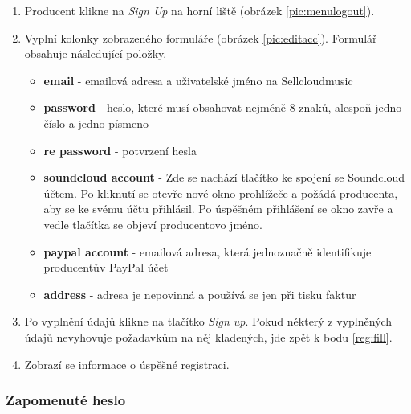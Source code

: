 \documentclass[12pt]{article}
\begin{document}
\begin{enumerate}

\item Producent klikne na \emph{Sign Up} na horní liště (obrázek \ref{pic:menulogout}).
\item \label{reg:fill} Vyplní kolonky zobrazeného formuláře (obrázek \ref{pic:editacc}). Formulář obsahuje následující položky.

\begin{itemize}
\item{\textbf{email}} - emailová adresa a uživatelské jméno na Sellcloudmusic
\item{\textbf{password}} - heslo, které musí obsahovat nejméně 8 znaků, alespoň jedno číslo a jedno písmeno
\item{\textbf{re password}} - potvrzení hesla
\item{\textbf{soundcloud account}} - Zde se nachází tlačítko ke spojení se Soundcloud účtem. Po kliknutí se otevře nové okno prohlížeče a požádá producenta, aby se ke svému účtu přihlásil. Po úspěšném přihlášení se okno zavře a vedle tlačítka se objeví producentovo jméno.
\item{\textbf{paypal account}} - emailová adresa, která jednoznačně identifikuje producentův PayPal účet
\item{\textbf{address}} - adresa je nepovinná a používá se jen při tisku faktur
\end{itemize}

\item Po vyplnění údajů klikne na tlačítko \emph{Sign up}. Pokud některý z vyplněných údajů nevyhovuje požadavkům na něj kladených, jde zpět k bodu \ref{reg:fill}.
\item Zobrazí se informace o úspěšné registraci.

\end{enumerate}
\subsubsection{Zapomenuté heslo} \label{fpwd}
\end{document}
